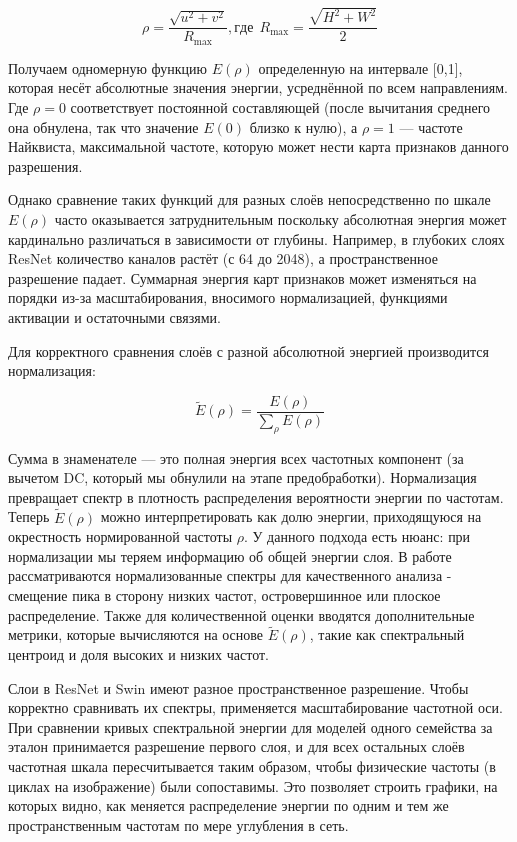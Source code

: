 \begin{equation}
    \rho = \frac{\sqrt{u^2 + v^2}}{R_{\max}}, где \ \ R_{\max} = \frac{\sqrt{H^2 + W^2}}{2}
\end{equation}

Получаем одномерную функцию $E(\rho)$ определенную на интервале [0,1], которая несёт абсолютные значения энергии, усреднённой по всем направлениям. Где $\rho=0$ соответствует постоянной составляющей (после вычитания среднего она обнулена, так что значение $E(0)$ близко к нулю), а $\rho=1$ — частоте Найквиста, максимальной частоте, которую может нести карта признаков данного разрешения.

Однако сравнение таких функций для разных слоёв непосредственно по шкале $E(\rho)$ часто оказывается затруднительным поскольку абсолютная энергия может кардинально различаться в зависимости от глубины. Например, в глубоких слоях ResNet количество каналов растёт (с 64 до 2048), а пространственное разрешение падает. Суммарная энергия карт признаков может изменяться на порядки из-за масштабирования, вносимого нормализацией, функциями активации и остаточными связями. 

Для корректного сравнения слоёв с разной абсолютной энергией производится нормализация:

\begin{equation}
    \tilde{E}(\rho) = \frac{E(\rho)}{\sum_{\rho} E(\rho)}
\end{equation}

Сумма в знаменателе — это полная энергия всех частотных компонент (за вычетом DC, который мы обнулили на этапе предобработки). 
Нормализация превращает спектр в плотность распределения вероятности энергии по частотам. Теперь $\tilde E(\rho)$ можно интерпретировать как долю энергии, приходящуюся на окрестность нормированной частоты $\rho$.
У данного подхода есть нюанс: при нормализации мы теряем информацию об общей энергии слоя. В работе рассматриваются нормализованные спектры для качественного анализа - смещение пика в сторону низких частот, островершинное или плоское распределение. Также для количественной оценки вводятся дополнительные метрики, которые вычисляются на основе $\tilde E(\rho)$, такие как спектральный центроид и доля высоких и низких частот.

Слои в ResNet и Swin имеют разное пространственное разрешение. Чтобы корректно сравнивать их спектры, применяется масштабирование частотной оси. При сравнении кривых спектральной энергии для моделей одного семейства за эталон принимается разрешение первого слоя, и для всех остальных слоёв частотная шкала пересчитывается таким образом, чтобы физические частоты (в циклах на изображение) были сопоставимы. Это позволяет строить графики, на которых видно, как меняется распределение энергии по одним и тем же пространственным частотам по мере углубления в сеть. 

